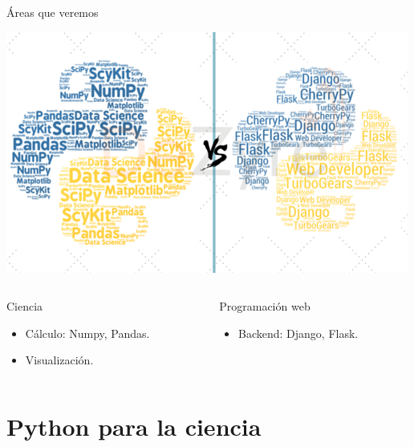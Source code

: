 \documentclass[bigger,unknownkeysallowed]{beamer}
\begin{document}
\begin{frame}[label={sec:orgc2c4850}]{Áreas que veremos}
\begin{center}
\begin{center}
\includegraphics[width=.6\textwidth]{sciencevsweb.png}
\end{center}
\end{center}

\begin{columns}
\begin{column}{0.5\columnwidth}
\begin{block}{Ciencia}
\begin{itemize}
\item Cálculo: Numpy, Pandas.

\item Visualización.
\end{itemize}
\end{block}
\end{column}

\begin{column}{0.5\columnwidth}
\begin{block}{Programación web}
\begin{itemize}
\item Backend: Django, Flask.
\end{itemize}
\end{block}
\end{column}
\end{columns}
\end{frame}


\section{Python para la ciencia}
\label{sec:org51c8c0c}
\end{document}
